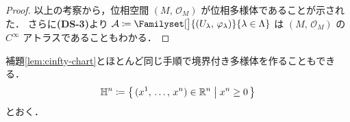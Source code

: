 \documentclass[TQFT_main]{subfiles}
\begin{document}
\begin{proof}
    以上の考察から，位相空間 $(M,\, \mathscr{O}_M)$ が位相多様体であることが示された．
	さらに\textsf{\textbf{(DS-3)}}より $\mathcal{A} \coloneqq \Familyset[\big]{(U_\lambda,\, \varphi_\lambda)}{\lambda \in \Lambda}$ は $(M,\, \mathscr{O}_M)$ の $C^\infty$ アトラスであることもわかる．


	
\end{proof}

補題\ref{lem:cinfty-chart}とほとんど同じ手順で境界付き多様体を作ることもできる．
\begin{align}
    \mathbb{H}^n \coloneqq \bigl\{\, (x^1,\, \dots,\, x^n) \in \mathbb{R}^n \bigm| x^n \ge 0 \,\bigr\} 
\end{align}
とおく．
\end{document}
